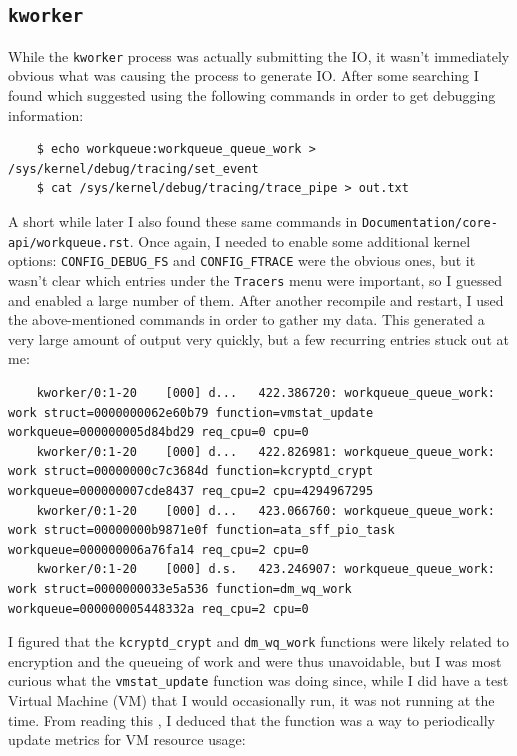 \documentclass{article}
\begin{document}
\subsection{\texttt{kworker}}
While the \texttt{kworker} process was actually submitting the IO, it wasn't immediately obvious what was causing the process to generate IO.  After some searching I found  which suggested using the following commands in order to get debugging information:
\begin{verbatim}
	$ echo workqueue:workqueue_queue_work > /sys/kernel/debug/tracing/set_event
	$ cat /sys/kernel/debug/tracing/trace_pipe > out.txt
\end{verbatim}
A short while later I also found these same commands in \texttt{Documentation/core-api/workqueue.rst}.  Once again, I needed to enable some additional kernel options: \texttt{CONFIG_DEBUG_FS} and \texttt{CONFIG_FTRACE} were the obvious ones, but it wasn't clear which entries under the \texttt{Tracers} menu were important, so I guessed and enabled a large number of them.  After another recompile and restart, I used the above-mentioned commands in order to gather my data.  This generated a very large amount of output very quickly, but a few recurring entries stuck out at me:
\begin{verbatim}
	kworker/0:1-20    [000] d...   422.386720: workqueue_queue_work: work struct=0000000062e60b79 function=vmstat_update workqueue=000000005d84bd29 req_cpu=0 cpu=0
	kworker/0:1-20    [000] d...   422.826981: workqueue_queue_work: work struct=00000000c7c3684d function=kcryptd_crypt workqueue=000000007cde8437 req_cpu=2 cpu=4294967295
	kworker/0:1-20    [000] d...   423.066760: workqueue_queue_work: work struct=00000000b9871e0f function=ata_sff_pio_task workqueue=000000006a76fa14 req_cpu=2 cpu=0
	kworker/0:1-20    [000] d.s.   423.246907: workqueue_queue_work: work struct=0000000033e5a536 function=dm_wq_work workqueue=000000005448332a req_cpu=2 cpu=0
\end{verbatim}
I figured that the \texttt{kcryptd_crypt} and \texttt{dm_wq_work} functions were likely related to encryption and the queueing of work and were thus unavoidable, but I was most curious what the \texttt{vmstat_update} function was doing since, while I did have a test Virtual Machine (VM) that I would occasionally run, it was not running at the time.  From reading this , I deduced that the function was a way to periodically update metrics for VM resource usage:
\end{document}
